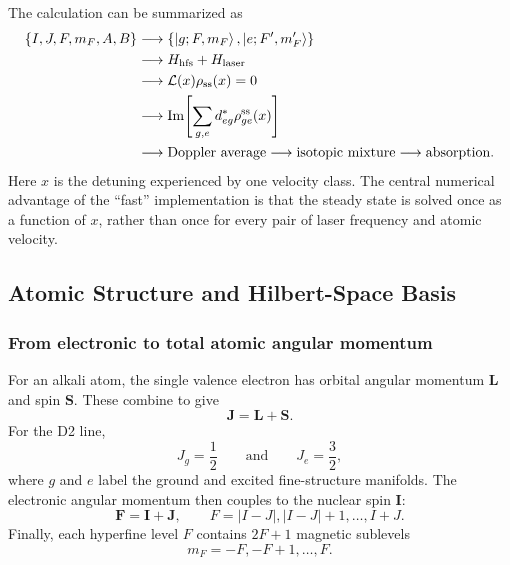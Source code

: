 The calculation can be summarized as
\begin{equation}
\begin{split}
\{I,J,F,m_F,A,B\}
&\longrightarrow
\{\left|g;F,m_F\right\rangle,\left|e;F',m_F'\right\rangle\}
\\
&\longrightarrow
H_{\mathrm{hfs}}+H_{\mathrm{laser}}
\\
&\longrightarrow
\mathcal{L}(x)\rho_{\mathrm{ss}}(x)=0
\\
&\longrightarrow
\operatorname{Im}\!\left[
\sum_{g,e}d_{eg}^{*}\rho_{ge}^{\mathrm{ss}}(x)
\right]
\\
&\longrightarrow
\text{Doppler average}
\longrightarrow
\text{isotopic mixture}
\longrightarrow
\text{absorption}.
\end{split}
\label{eq:dm_model_chain}
\end{equation}
Here \(x\) is the detuning experienced by one velocity class.  The central
numerical advantage of the ``fast'' implementation is that the steady state is
solved once as a function of \(x\), rather than once for every pair of laser
frequency and atomic velocity.

\subsection{Atomic Structure and Hilbert-Space Basis}
\label{subsec:dm_atomic_basis}

\subsubsection{From electronic to total atomic angular momentum}

For an alkali atom, the single valence electron has orbital angular momentum
\(\mathbf{L}\) and spin \(\mathbf{S}\).  These combine to give
\begin{equation}
\mathbf{J}=\mathbf{L}+\mathbf{S}.
\end{equation}
For the D2 line,
\begin{equation}
J_g=\frac{1}{2}
\qquad\text{and}\qquad
J_e=\frac{3}{2},
\end{equation}
where \(g\) and \(e\) label the ground and excited fine-structure manifolds.
The electronic angular momentum then couples to the nuclear spin
\(\mathbf{I}\):
\begin{equation}
\mathbf{F}=\mathbf{I}+\mathbf{J},
\qquad
F=|I-J|,|I-J|+1,\ldots,I+J.
\label{eq:F_addition}
\end{equation}
Finally, each hyperfine level \(F\) contains \(2F+1\) magnetic sublevels
\begin{equation}
m_F=-F,-F+1,\ldots,F.
\end{equation}

